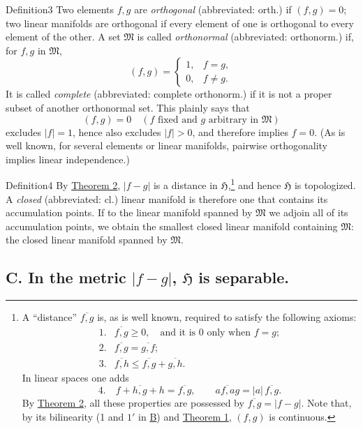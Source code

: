 ﻿\documentclass[paper=b5,fontsize=13pt,bookmarkpackage=false,twoside]{scrartcl}
\begin{document}
\begin{namedstatement}{Definition}{3}\label{def:3}
Two elements $f,g$ are \emph{orthogonal} (abbreviated: orth.) if $(f,g)=0$; two linear manifolds are orthogonal if every element of one is orthogonal to every element of the other. A set $\mathfrak M$ is called \emph{orthonormal} (abbreviated: orthonorm.) if, for $f,g$ in $\mathfrak M$,
\[
 (f,g)=
 \begin{cases}
 1,&f=g,\\
 0,&f\ne g.
 \end{cases}
\]
It is called \emph{complete} (abbreviated: complete orthonorm.) if it is not a proper subset of another orthonormal set. This plainly says that
\[
 (f,g)=0
 \quad
 (f\text{ fixed and }g\text{ arbitrary in }\mathfrak M)
\]
excludes $|f|=1$, hence also excludes $|f|>0$, and therefore implies $f=0$. (As is well known, for several elements or linear manifolds, pairwise orthogonality implies linear independence.)
\end{namedstatement}

\begin{namedstatement}{Definition}{4}\label{def:4}
By \hyperref[thm:2]{Theorem 2}, $|f-g|$ is a distance in $\mathfrak H$,\footnote{\label{fn:source-27}A ``distance'' $\overline{f,g}$ is, as is well known, required to satisfy the following axioms:
\[
\begin{array}{ll}
1.&\overline{f,g}\ge0,\quad\text{and it is $0$ only when $f=g$};\\
2.&\overline{f,g}=\overline{g,f};\\
3.&\overline{f,h}\le\overline{f,g}+\overline{g,h}.
\end{array}
\]
In linear spaces one adds
\[
 4.\quad
 \overline{f+h,g+h}=\overline{f,g},
 \qquad
 \overline{af,ag}=|a|\,\overline{f,g}.
\]
By \hyperref[thm:2]{Theorem 2}, all these properties are possessed by $\overline{f,g}=|f-g|$. Note that, by its bilinearity (1 and $1'$ in \hyperref[axiom:B]{B}) and \hyperref[thm:1]{Theorem 1}, $(f,g)$ is continuous.} and hence $\mathfrak H$ is topologized. A \emph{closed} (abbreviated: cl.) linear manifold is therefore one that contains its accumulation points. If to the linear manifold spanned by $\mathfrak M$ we adjoin all of its accumulation points, we obtain the smallest closed linear manifold containing $\mathfrak M$: the closed linear manifold spanned by $\mathfrak M$.
\end{namedstatement}

\subsection*{C. In the metric $|f-g|$, $\mathfrak H$ is separable.}\label{axiom:C}
\end{document}
